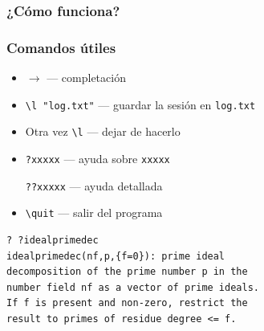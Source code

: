 \documentclass{beamer}
\begin{document}
\begin{frame}
  \frametitle{¿Cómo funciona?}

  \begin{center}\setlength{\fboxsep}{0pt}\setlength{\fboxrule}{0.5pt}
  \end{center}

\end{frame}


\begin{frame}[fragile]
  \frametitle{Comandos útiles}

  \begin{itemize}
  \item $\boxed{\rightarrow}$ --- completación

  \item \texttt{\textbackslash{}l "log.txt"} --- guardar la sesión en
    \texttt{log.txt}

  \item Otra vez \texttt{\textbackslash{}l} --- dejar de hacerlo

  \item \texttt{?xxxxx} --- ayuda sobre \texttt{xxxxx}

    \texttt{??xxxxx} --- ayuda detallada

  \item \texttt{\textbackslash{}quit} --- salir del programa
  \end{itemize}

  \begin{shaded}\small
\begin{verbatim}
? ?idealprimedec
idealprimedec(nf,p,{f=0}): prime ideal 
decomposition of the prime number p in the 
number field nf as a vector of prime ideals. 
If f is present and non-zero, restrict the 
result to primes of residue degree <= f.
\end{verbatim}
\end{shaded}
\end{frame}
\end{document}

